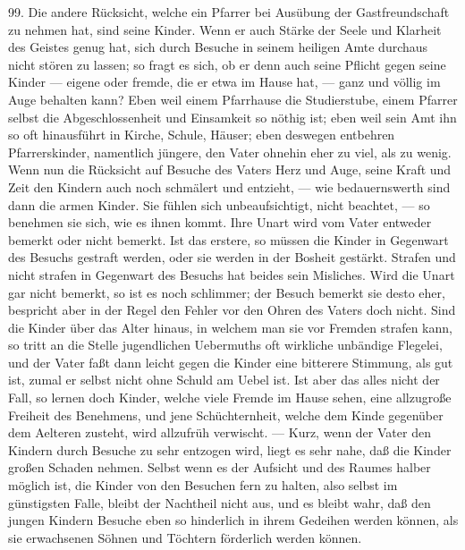 99. Die andere Rücksicht, welche ein Pfarrer bei Ausübung der Gastfreundschaft zu nehmen hat, sind seine Kinder. Wenn er auch Stärke der Seele und Klarheit des Geistes genug hat, sich durch Besuche in seinem heiligen Amte durchaus nicht stören zu lassen; so fragt es sich,
ob er denn auch seine Pflicht gegen seine Kinder — eigene oder fremde, die er etwa im Hause hat, — ganz und völlig im Auge behalten kann? Eben weil einem Pfarrhause die Studierstube, einem Pfarrer selbst die Abgeschlossenheit und Einsamkeit so nöthig ist; eben weil sein Amt ihn so oft hinausführt in Kirche, Schule, Häuser; eben deswegen entbehren Pfarrerskinder, namentlich jüngere, den Vater ohnehin eher zu viel, als zu wenig. Wenn nun die Rücksicht auf Besuche des Vaters Herz und Auge, seine Kraft und Zeit den Kindern auch noch schmälert und entzieht, — wie bedauernswerth sind dann die armen Kinder. Sie fühlen sich unbeaufsichtigt, nicht beachtet, — so benehmen sie sich, wie es ihnen kommt. Ihre Unart wird vom Vater entweder bemerkt oder nicht bemerkt. Ist das erstere, so müssen die Kinder in Gegenwart des Besuchs gestraft werden, oder sie werden in der Bosheit gestärkt. Strafen und nicht strafen in Gegenwart des Besuchs hat beides sein Misliches. Wird die Unart gar nicht bemerkt, so ist es noch schlimmer; der Besuch bemerkt sie desto eher, bespricht aber in der Regel den Fehler vor den Ohren des Vaters doch nicht. Sind die Kinder über das Alter hinaus, in welchem man sie vor Fremden strafen kann, so tritt an die Stelle jugendlichen Uebermuths oft wirkliche unbändige Flegelei, und der Vater faßt dann leicht gegen die Kinder eine bitterere Stimmung, als gut ist, zumal er selbst nicht ohne Schuld am Uebel ist. Ist aber das alles nicht der Fall, so lernen doch Kinder, welche viele Fremde im Hause sehen, eine allzugroße Freiheit des Benehmens, und jene Schüchternheit, welche dem Kinde gegenüber dem Aelteren
zusteht, wird allzufrüh verwischt. — Kurz, wenn der Vater den Kindern durch Besuche zu sehr entzogen wird, liegt es sehr nahe, daß die Kinder großen Schaden nehmen. Selbst wenn es der Aufsicht und des Raumes halber möglich ist, die Kinder von den Besuchen fern zu halten, also selbst im günstigsten Falle, bleibt der Nachtheil nicht aus, und es bleibt wahr, daß den jungen Kindern Besuche eben so hinderlich in ihrem Gedeihen werden können, als sie erwachsenen Söhnen und Töchtern förderlich werden können.

